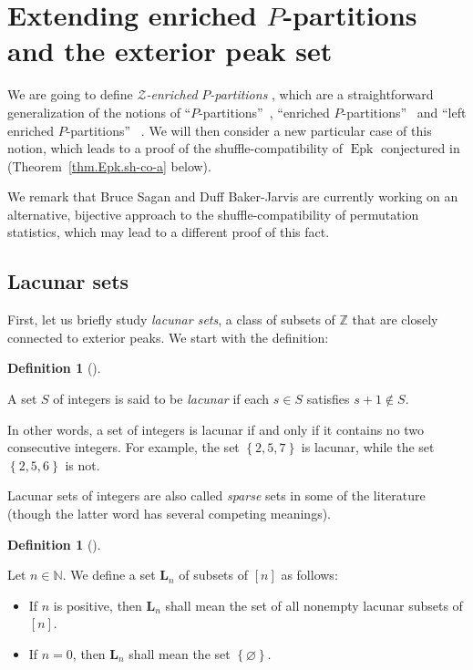 \documentclass[numbers=enddot,12pt,final,onecolumn,notitlepage]{scrartcl}%
\theoremstyle{definition}
\newtheorem{defi}[theo]{Definition}
\newenvironment{definition}[1][]
{\begin{defi}[#1]\begin{leftbar}}
{\end{leftbar}\end{defi}}
\begin{document}
\section{\label{sect.Zenri}Extending enriched $P$-partitions and the exterior
peak set}

We are going to define \textit{$\mathcal{Z}$-enriched }$P$\textit{-partitions}%
, which are a straightforward generalization of the notions of
\textquotedblleft$P$-partitions\textquotedblright\ \cite{Stanle72},
\textquotedblleft enriched $P$-partitions\textquotedblright\ \cite[\S 2]{Stembr97}
and \textquotedblleft left enriched $P$-partitions\textquotedblright
\ \cite{Peters05}. We will then consider a new particular case
of this notion, which leads to a proof of the shuffle-compatibility of
$\operatorname{Epk}$ conjectured in \cite{part1}
(Theorem~\ref{thm.Epk.sh-co-a} below).

We remark that Bruce Sagan and Duff Baker-Jarvis are currently working on an
alternative, bijective approach to the shuffle-compatibility of permutation
statistics, which may lead to a different proof of this fact.

\subsection{Lacunar sets}

First, let us briefly study \textit{lacunar sets}, a class of subsets
of $\mathbb{Z}$ that are closely connected to exterior peaks.
We start with the definition:

\begin{definition}
A set $S$ of integers is said to be \textit{lacunar} if each $s\in S$
satisfies $s+1\notin S$.
\end{definition}

In other words, a set of integers is lacunar if and only if it contains no two
consecutive integers. For example, the set $\left\{  2, 5, 7\right\}  $ is
lacunar, while the set $\left\{  2, 5, 6\right\}  $ is not.

Lacunar sets of integers are also called \textit{sparse} sets in some of the
literature (though the latter word has several competing meanings).

\begin{definition}
\label{def.lac.Ln}
Let $n\in\mathbb{N}$. We define a set $\mathbf{L}_{n}$ of subsets of $\left[
n\right]  $ as follows:

\begin{itemize}
\item If $n$ is positive, then $\mathbf{L}_{n}$ shall mean the set of all
nonempty lacunar subsets of $\left[  n\right]  $.

\item If $n=0$, then $\mathbf{L}_{n}$ shall mean the set $\left\{
\varnothing\right\}  $.
\end{itemize}
\end{definition}
\end{document}
